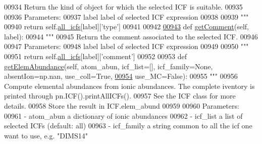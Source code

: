 \begin{DoxyCode}
{{{00934 \textcolor{stringliteral}{        Return the kind of object for which the selected ICF is suitable. }
00935 \textcolor{stringliteral}{        }
00936 \textcolor{stringliteral}{        Parameters:}
00937 \textcolor{stringliteral}{            label    label of selected ICF expression}
00938 \textcolor{stringliteral}{}
00939 \textcolor{stringliteral}{        """}
00940         \textcolor{keywordflow}{return} self.\hyperlink{classpyneb_1_1core_1_1icf_1_1_i_c_f_a854ee87a53feb102e429e902227ce88b}{all\_icfs}[label][\textcolor{stringliteral}{'type'}]
00941         
00942 
\hypertarget{icf_8py_source_l00943}{}\hyperlink{classpyneb_1_1core_1_1icf_1_1_i_c_f_a0a07d882935f470f4c51af82ed785217}{00943}     \textcolor{keyword}{def }\hyperlink{classpyneb_1_1core_1_1icf_1_1_i_c_f_a0a07d882935f470f4c51af82ed785217}{getComment}(self, label): 
00944         \textcolor{stringliteral}{""" }
00945 \textcolor{stringliteral}{        Return the comment associated to the selected ICF. }
00946 \textcolor{stringliteral}{        }
00947 \textcolor{stringliteral}{        Parameters:}
00948 \textcolor{stringliteral}{            label    label of selected ICF expression}
00949 \textcolor{stringliteral}{}
00950 \textcolor{stringliteral}{        """}
00951         \textcolor{keywordflow}{return} self.\hyperlink{classpyneb_1_1core_1_1icf_1_1_i_c_f_a854ee87a53feb102e429e902227ce88b}{all\_icfs}[label][\textcolor{stringliteral}{'comment'}]
00952 
00953     \textcolor{keyword}{def }\hyperlink{classpyneb_1_1core_1_1icf_1_1_i_c_f_a30b52d6d1ec148fba7c0a15cad653f61}{getElemAbundance}(self, atom\_abun, icf\_list=[], icf\_family=None, absentIon=np.nan, 
      use\_coll=True,
\hypertarget{icf_8py_source_l00954}{}\hyperlink{classpyneb_1_1core_1_1icf_1_1_i_c_f_a30b52d6d1ec148fba7c0a15cad653f61}{00954}                          use\_MC=\textcolor{keyword}{False}):
00955         \textcolor{stringliteral}{"""}
00956 \textcolor{stringliteral}{        Compute elemental abundances from ionic abundances. The complete iventory is printed through
       pn.ICF().printAllICFs().}
00957 \textcolor{stringliteral}{        See the ICF class for more details.}
00958 \textcolor{stringliteral}{        Store the result in ICF.elem\_abund}
00959 \textcolor{stringliteral}{        }
00960 \textcolor{stringliteral}{        Parameters: }
00961 \textcolor{stringliteral}{           - atom\_abun    a dictionary of ionic abundances}
00962 \textcolor{stringliteral}{           - icf\_list     a list of selected ICFs (default: all)}
00963 \textcolor{stringliteral}{           - icf\_family   a string common to all the icf one want to use, e.g. "DIMS14"}
}}}
\end{DoxyCode}
